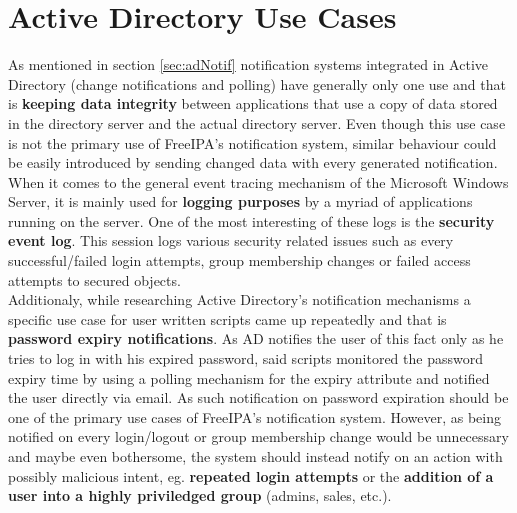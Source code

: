 \section{Active Directory Use Cases}
As mentioned in section \ref{sec:adNotif} notification systems integrated in Active Directory (change notifications and polling) have generally only one use and that is \textbf{keeping data integrity} between applications that use a copy of data
stored in the directory server and the actual directory server. Even though this use case is not the primary use of FreeIPA's notification system, similar behaviour could be easily introduced
by sending changed data with every generated notification. \\
When it comes to the general event tracing mechanism of the Microsoft Windows Server, it is mainly used for \textbf{logging purposes} by a myriad of applications running on the server.
One of the most interesting of these logs is the \textbf{security event log}. This session logs various security related issues such as every successful/failed login attempts, group membership changes
or failed access attempts to secured objects. \\
Additionaly, while researching Active Directory's notification mechanisms a specific use case for user written scripts came up repeatedly and that is \textbf{password expiry notifications}.
As AD notifies the user of this fact only as he tries to log in with his expired password, said scripts monitored the password expiry time by using a polling mechanism for the expiry attribute and notified the user directly via email.
As such notification on password expiration should be one of the primary use cases of FreeIPA's notification system.
However, as being notified on every login/logout or group membership change would be unnecessary and maybe even bothersome, the system should instead notify on an action with possibly malicious intent,
eg. \textbf{repeated login attempts} or the \textbf{addition of a user into a highly priviledged group} (admins, sales, etc.).
